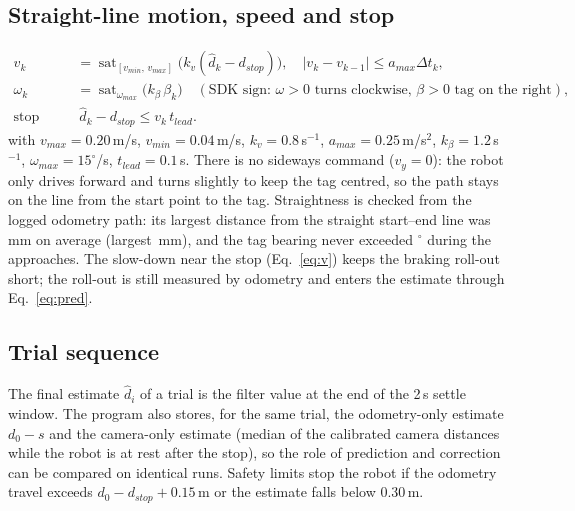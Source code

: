\documentclass[11pt,a4paper]{article}
\begin{document}
\subsection{Straight-line motion, speed and stop}\label{sec:steer}
\begin{align}
v_k&=\operatorname{sat}_{[v_{min},\,v_{max}]}\!\big(k_v(\hat d_k-d_{stop})\big),\quad |v_k-v_{k-1}|\le a_{max}\Delta t_k, \label{eq:v}\\
\omega_k&=\operatorname{sat}_{\omega_{max}}\!\big(k_\beta\,\beta_k\big)\quad(\text{SDK sign: } \omega>0 \text{ turns clockwise, } \beta>0 \text{ tag on the right}), \label{eq:w}\\
\text{stop when }&\ \hat d_k-d_{stop}\le v_k\,t_{lead}. \label{eq:stop}
\end{align}
with $v_{max}=0.20$\,m/s, $v_{min}=0.04$\,m/s, $k_v=0.8$\,s$^{-1}$, $a_{max}=0.25$\,m/s$^2$, $k_\beta=1.2$\,s$^{-1}$, $\omega_{max}=15^\circ$/s, $t_{lead}=0.1$\,s. There is no sideways command ($v_y=0$): the robot only drives forward and turns slightly to keep the tag centred, so the path stays on the line from the start point to the tag. Straightness is checked from the logged odometry path: its largest distance from the straight start--end line was \ResLateral\,mm on average (largest \ResLateralMax\,mm), and the tag bearing never exceeded \ResBearingMax$^\circ$ during the approaches. The slow-down near the stop (Eq.~\ref{eq:v}) keeps the braking roll-out short; the roll-out is still measured by odometry and enters the estimate through Eq.~\eqref{eq:pred}.

\subsection{Trial sequence}
\begin{center}
\end{center}
The final estimate $\hat d_i$ of a trial is the filter value at the end of the 2\,s settle window. The program also stores, for the same trial, the odometry-only estimate $d_0-s$ and the camera-only estimate (median of the calibrated camera distances while the robot is at rest after the stop), so the role of prediction and correction can be compared on identical runs. Safety limits stop the robot if the odometry travel exceeds $d_0-d_{stop}+0.15$\,m or the estimate falls below 0.30\,m.
\end{document}
